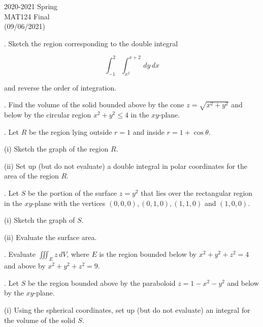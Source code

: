 \documentclass{article}
\begin{document}
\pagestyle{empty}
\large

\begin{center}
2020-2021 Spring \\MAT124 Final\\(09/06/2021)
\end{center}

. Sketch the region corresponding to the double integral

\[\int_{-1}^2\int_{x^2}^{x+2}\,dy\,dx\]

\hfill

\noindent and reverse the order of integration.

\hfill

. Find the volume of the solid bounded above by the cone $z=\sqrt{x^2+y^2}$ and below by the circular region $x^2+y^2\leq4$ in the $xy$-plane.

\hfill

. Let $R$ be the region lying outside $r=1$ and inside $r=1+\cos\theta$.

\hfill

\noindent (i) Sketch the graph of the region $R$.

\hfill

\noindent (ii) Set up (but do not evaluate) a double integral in polar coordinates for the area of the region $R$.

\hfill

. Let $S$ be the portion of the surface $z=y^2$ that lies over the rectangular region in the $xy$-plane with the vertices $(0,0,0), (0,1,0), (1,1,0)$ and $(1,0,0)$.

\hfill

\noindent (i) Sketch the graph of $S$.

\hfill

\noindent (ii) Evaluate the surface area.

\hfill

. Evaluate $\displaystyle \iiint_E z\,dV$, where $E$ is the region bounded below by $x^2+y^2+z^2=4$ and above by $x^2+y^2+z^2=9$.

\hfill

. Let $S$ be the region bounded above by the paraboloid $z=1-x^2-y^2$ and below by the $xy$-plane.

\hfill

\noindent (i) Using the spherical coordinates, set up (but do not evaluate) an integral for the volume of the solid $S$.

\hfill
\end{document}
